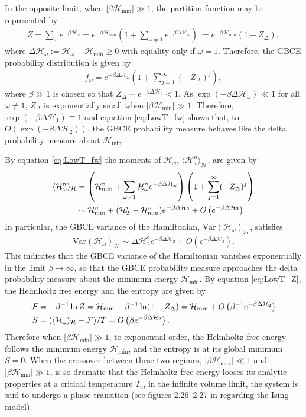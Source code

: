 \documentclass[english,12pt]{ttuthes}
\newcommand{\Hc}{\mathcal{H}}
\newcommand{\Fc}{\mathcal{F}}
\newcommand{\HM}{\mathcal{H}_{\text{max}}}
\newcommand{\Hm}{\mathcal{H}_{\text{min}}}
\begin{document}
In the opposite limit, when $|\beta\Hm|\gg1$, the partition function may be
represented by
%
\begin{align}\label{eq:LowT_Z}
  Z=\sum_\omega e^{-\beta\Hc_\omega}=e^{-\beta\Hm}\left(1+\sum_{\omega\neq1}e^{-\beta\Delta\Hc_\omega}\right)
   :=e^{-\beta\Hm}(1+Z_{\Delta}),   
\end{align}
%
where $\Delta\Hc_\omega:=\Hc_\omega-\Hm \geq0$ with equality only if
$\omega=1$. Therefore, the GBCE probability distribution is given by 
%
\begin{align}\label{eq:LowT_fw}
  f_\omega=e^{-\beta\Delta\Hc_\omega}\left(1+\sum_{j=1}^\infty(-Z_{\Delta})^j\right),
\end{align}
%
where $\beta\gg1$ is chosen so that $Z_{\Delta}\sim e^{-\beta\Delta\Hc_2}<1$. As
$\exp(-\beta\Delta\Hc_\omega)\ll1$ for all $\omega\neq1$, $Z_{\Delta}$ is exponentially
small when $|\beta\Hm|\gg1$. Therefore, $\exp(-\beta\Delta\Hc_1)\equiv1$ and
equation \eqref{eq:LowT_fw} shows that, to
$O(\exp(-\beta\Delta\Hc_2))$, the GBCE probability measure behaves like 
the delta probability measure about $\Hm$.

By equation \eqref{eq:LowT_fw} the moments of
$\Hc_\omega$, $\langle\Hc_\omega^n\rangle_{\Hc}$, are given by
%
\begin{align}
   \langle\Hc_\omega^n\rangle_{\Hc}&=\left(\Hm^n+\sum_{\omega\neq1}\Hc_\omega^ne^{-\beta\Delta\Hc_\omega}
                          \right)
                          \left(1+\sum_{j=1}^\infty(-Z_{\Delta})^j\right)\\
                          &\sim\Hm^n+(\Hc_2^n-\Hm^n)e^{-\beta\Delta\Hc_2}
                          +O\left(e^{-\beta\Delta\Hc_3}\right)\notag
\end{align}
%
In particular, the GBCE variance of the Hamiltonian,
$\text{Var}(\Hc_\omega)_{\Hc}$, satisfies
%
\begin{align}
  \text{Var}(\Hc_\omega)_{\Hc}
  \sim\Delta\Hc_2^2e^{-\beta\Delta\Hc_2}+O\left(e^{-\beta\Delta\Hc_3}\right).
\end{align}
%
This indicates that the GBCE variance of the Hamiltonian vanishes
exponentially in the limit $\beta\to\infty$, so that the GBCE probability measure
approaches the delta probability measure about the minimum energy
$\Hm$. By equation \eqref{eq:LowT_Z}, the Helmholtz free energy and
the entropy are given by
%
\begin{align}
  \Fc&=-\beta^{-1}\ln{Z}=\Hm-\beta^{-1}\ln(1+Z_{\Delta})
              =\Hm+O\left(\beta^{-1}e^{-\beta\Delta\Hc_2}\right)\\
  S&=(\langle\Hc_\omega\rangle_{\Hc}-\Fc)/T
    =O\left(\beta e^{-\beta\Delta\Hc_2}\right).\notag 
\end{align}
%
Therefore when $|\beta\Hm|\gg1$, to exponential order, the Helmholtz free
energy follows the minimum energy $\Hm$, and the entropy is at its
global minimum $S=0$. When the crossover between these two regimes,
$|\beta\HM|\ll1$ and $|\beta\Hm|\gg1$, is so dramatic that the Helmholtz free
energy looses its analytic properties at a critical temperature $T_c$,
in the infinite volume limit, the system is said to undergo a phase
transition (see figures 2.26--2.27 in \cite{Christensen-2005}
regarding the Ising model).
%
\end{document}
